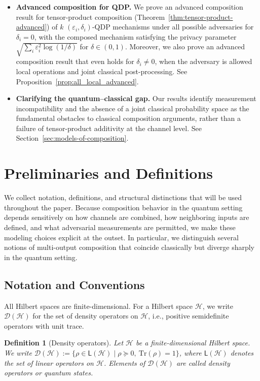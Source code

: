 \documentclass[11pt]{article}
\def\Tr{\mathrm{Tr}}
\theoremstyle{plain}
\newtheorem{definition}[theo]{Definition}
\theoremstyle{remark}
\newcommand{\edit}[1]{{\color{black} #1}}
\begin{document}
\begin{itemize}
  \item \textbf{Advanced composition for QDP.} We prove an advanced composition result for \edit{tensor-product composition} (Theorem~\ref{thm:tensor-product-advanced}) of $k$ $(\varepsilon_i,\delta_i)$-QDP mechanisms under all possible adversaries for $\delta_i=0$, with the composed mechanism satisfying the privacy parameter $\sqrt{\sum_i \varepsilon_i^2 \log(1/\delta)}$ for $\delta \in (0,1)$. Moreover, we also prove an advanced composition result that even holds for $\delta_i \neq 0$, when the adversary is allowed local operations and joint classical post-processing.
  See Proposition~\ref{prop:all_local_advanced}.

  \item \textbf{Clarifying the quantum–classical gap.}
  Our results identify measurement incompatibility and the absence of a joint classical probability space as the fundamental obstacles to classical composition arguments, rather than a failure of tensor-product additivity at the channel level. See Section~\ref{sec:models-of-composition}.
\end{itemize}



\section{Preliminaries and Definitions}

We collect notation, definitions, and structural distinctions that will be used throughout the paper.
Because composition behavior in the quantum setting depends sensitively on how channels are combined, how neighboring inputs are defined, and what adversarial measurements are permitted, we make these modeling choices explicit at the outset.
In particular, we distinguish several notions of multi-output composition that coincide classically but diverge sharply in the quantum setting.

\subsection{Notation and Conventions}

All Hilbert spaces are finite-dimensional.
For a Hilbert space $\mathcal{H}$, we write $\mathcal{D}(\mathcal{H})$ for the set of density operators on $\mathcal{H}$, i.e.,
positive semidefinite operators with unit trace.

\begin{definition}[Density operators]
Let $\mathcal{H}$ be a finite-dimensional Hilbert space. We write
$\mathcal{D}(\mathcal{H})
:= \bigl\{ \rho \in \mathsf{L}(\mathcal{H}) \;\big|\; 
\rho \succeq 0,\ \Tr(\rho)=1 \bigr\}$,
where $\mathsf{L}(\mathcal{H})$ denotes the set of linear operators on $\mathcal{H}$.
Elements of $\mathcal{D}(\mathcal{H})$ are called \emph{density operators} or \emph{quantum states}.
\label{def:density-operators}
\end{definition}
\end{document}
